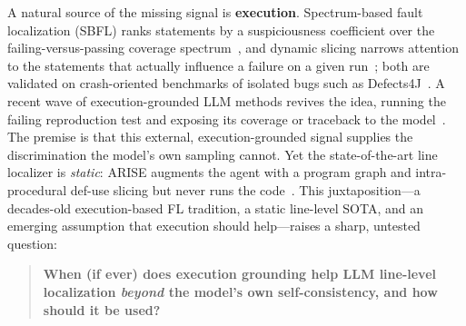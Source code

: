 \documentclass[11pt]{article}
\begin{document}
A natural source of the missing signal is \textbf{execution}. Spectrum-based fault localization (SBFL) ranks statements by a suspiciousness coefficient over the failing-versus-passing coverage spectrum~\citep{tarantula,ochiai,dstar,wong_survey}, and dynamic slicing narrows attention to the statements that actually influence a failure on a given run~\citep{korel_laski,agrawal_horgan}; both are validated on crash-oriented benchmarks of isolated bugs such as Defects4J~\citep{defects4j}. A recent wave of execution-grounded LLM methods revives the idea, running the failing reproduction test and exposing its coverage or traceback to the model~\citep{autofl,autocoderover,agentfl}. The premise is that this external, execution-grounded signal supplies the discrimination the model's own sampling cannot. Yet the state-of-the-art line localizer is \emph{static}: ARISE augments the agent with a program graph and intra-procedural def-use slicing but never runs the code~\citep{arise}. This juxtaposition---a decades-old execution-based FL tradition, a static line-level SOTA, and an emerging assumption that execution should help---raises a sharp, untested question:

\begin{quote}
\textbf{When (if ever) does execution grounding help LLM line-level localization \emph{beyond} the model's own self-consistency, and how should it be used?}
\end{quote}
\end{document}
